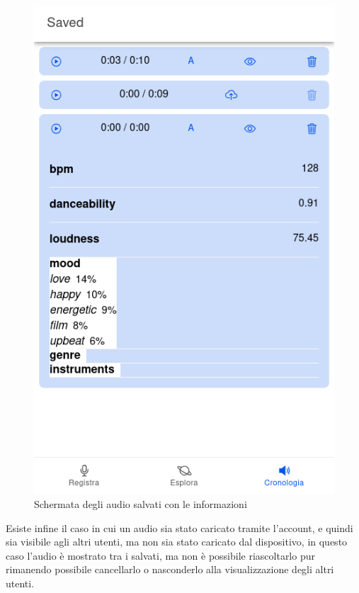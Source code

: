 \documentclass{article}
\begin{document}
\begin{figure}[H]
\begin{minipage}{0.48\textwidth}
        \includegraphics[width=\linewidth]{saved-infos.png}
        \centering
        \caption{Schermata degli audio salvati con le informazioni}
        \label{fig:saved-infos}
    \end{minipage}
\end{figure}

Esiste infine il caso in cui un audio sia stato caricato tramite l'account, e quindi sia visibile agli altri utenti, ma non sia stato caricato dal dispositivo, in questo caso l'audio è mostrato tra i salvati, ma non è possibile riascoltarlo pur rimanendo possibile cancellarlo o nasconderlo alla visualizzazione degli altri utenti.
\end{document}
